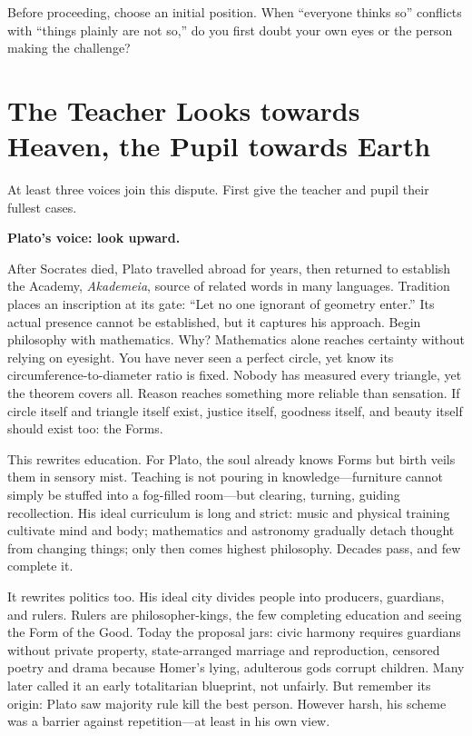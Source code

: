 Before proceeding, choose an initial position. When ``everyone thinks so'' conflicts with ``things plainly are not so,'' do you first doubt your own eyes or the person making the challenge?

\section[The Teacher Looks Up, the Pupil Down]{The Teacher Looks towards Heaven, the Pupil towards Earth}
At least three voices join this dispute. First give the teacher and pupil their fullest cases.

\textbf{Plato's voice: look upward.}

After Socrates died, Plato travelled abroad for years, then returned to establish the Academy, \textit{Akademeia}, source of related words in many languages. Tradition places an inscription at its gate: ``Let no one ignorant of geometry enter.'' Its actual presence cannot be established, but it captures his approach. Begin philosophy with mathematics. Why? Mathematics alone reaches certainty without relying on eyesight. You have never seen a perfect circle, yet know its circumference-to-diameter ratio is fixed. Nobody has measured every triangle, yet the theorem covers all. Reason reaches something more reliable than sensation. If circle itself and triangle itself exist, justice itself, goodness itself, and beauty itself should exist too: the Forms.

This rewrites education. For Plato, the soul already knows Forms but birth veils them in sensory mist. Teaching is not pouring in knowledge---furniture cannot simply be stuffed into a fog-filled room---but clearing, turning, guiding recollection. His ideal curriculum is long and strict: music and physical training cultivate mind and body; mathematics and astronomy gradually detach thought from changing things; only then comes highest philosophy. Decades pass, and few complete it.

It rewrites politics too. His ideal city divides people into producers, guardians, and rulers. Rulers are philosopher-kings, the few completing education and seeing the Form of the Good. Today the proposal jars: civic harmony requires guardians without private property, state-arranged marriage and reproduction, censored poetry and drama because Homer's lying, adulterous gods corrupt children. Many later called it an early totalitarian blueprint, not unfairly. But remember its origin: Plato saw majority rule kill the best person. However harsh, his scheme was a barrier against repetition---at least in his own view.

